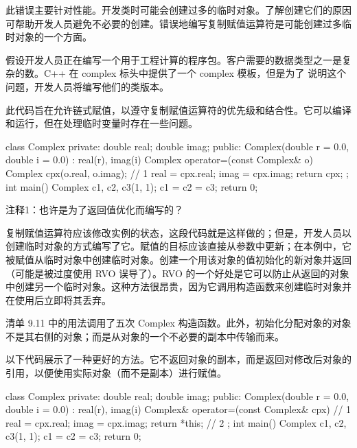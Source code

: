此错误主要针对性能。开发类时可能会创建过多的临时对象。了解创建它们的原因可帮助开发人员避免不必要的创建。错误地编写复制赋值运算符是可能创建过多临时对象的一个方面。


假设开发人员正在编写一个用于工程计算的程序包。客户需要的数据类型之一是复杂的数。C++ 在 complex 标头中提供了一个 complex 模板，但是为了 说明这个问题，开发人员将编写他们的类版本。

此代码旨在允许链式赋值，以遵守复制赋值运算符的优先级和结合性。它可以编译和运行，但在处理临时变量时存在一些问题。


\begin{cpp}
class Complex {
private:
  double real;
  double imag;
public:
  Complex(double r = 0.0, double i = 0.0) : real(r), imag(i) {}
  Complex operator=(const Complex& o) {
  Complex cpx(o.real, o.imag); // 1
    real = cpx.real;
    imag = cpx.imag;
    return cpx;
  }
};
int main() {
  Complex c1, c2, c3(1, 1);
  c1 = c2 = c3;
  return 0;
}
\end{cpp}

{\footnotesize
注释1：也许是为了返回值优化而编写的？
}


复制赋值运算符应该修改实例的状态，这段代码就是这样做的；但是，开发人员以创建临时对象的方式编写了它。赋值的目标应该直接从参数中更新；在本例中，它被赋值从临时对象中创建临时对象。创建一个用该对象的值初始化的新对象并返回（可能是被过度使用 RVO 误导了）。RVO 的一个好处是它可以防止从返回的对象中创建另一个临时对象。这种方法很昂贵，因为它调用构造函数来创建临时对象并在使用后立即将其丢弃。

清单 9.11 中的用法调用了五次 Complex 构造函数。此外，初始化分配对象的对象不是其右侧的对象；而是从对象的一个不必要的副本中传输而来。


以下代码展示了一种更好的方法。它不返回对象的副本，而是返回对修改后对象的引用，以便使用实际对象（而不是副本）进行赋值。


\begin{cpp}
class Complex {
private:
  double real;
  double imag;
public:
  Complex(double r = 0.0, double i = 0.0) : real(r), imag(i) {}
  Complex& operator=(const Complex& cpx) { // 1
    real = cpx.real;
    imag = cpx.imag;
    return *this; // 2
  }
};
int main() {
  Complex c1, c2, c3(1, 1);
  c1 = c2 = c3;
  return 0;
}
\end{cpp}

